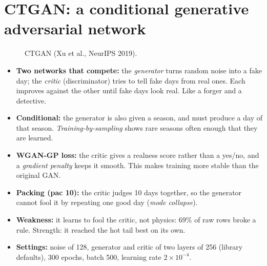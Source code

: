 \section{CTGAN: a conditional generative adversarial network}
\begin{figure}[H]
\centering
{}
\caption{CTGAN (Xu et al., NeurIPS 2019).}
\end{figure}
\begin{itemize}
  \item \textbf{Two networks that compete:} the \emph{generator} turns random noise into a fake day; the \emph{critic}
        (discriminator) tries to tell fake days from real ones. Each improves against the other until fake days look
        real. Like a forger and a detective.
  \item \textbf{Conditional:} the generator is also given a season, and must produce a day of that season.
        \emph{Training-by-sampling} shows rare seasons often enough that they are learned.
  \item \textbf{WGAN-GP loss:} the critic gives a realness score rather than a yes/no, and a \emph{gradient penalty}
        keeps it smooth. This makes training more stable than the original GAN.
  \item \textbf{Packing (pac 10):} the critic judges 10 days together, so the generator cannot fool it by repeating one
        good day (\emph{mode collapse}).
  \item \textbf{Weakness:} it learns to fool the critic, not physics: 69\% of raw rows broke a rule. Strength: it
        reached the hot tail best on its own.
  \item \textbf{Settings:} noise of 128, generator and critic of two layers of 256 (library defaults), 300 epochs,
        batch 500, learning rate $2\times10^{-4}$.
\end{itemize}

